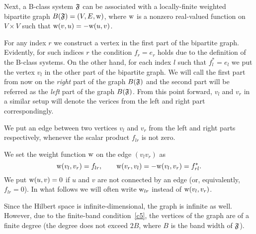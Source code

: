 \documentclass[12pt,oneside,a4paper]{amsart}
\begin{document}
    Next, a B-class system $\mathfrak{F}$ can be associated with a
      locally-finite weighted bipartite graph $B(\mathfrak{F}) = (V, E, \mathrm{w})$, where $\mathrm{w}$ is a
      nonzero real-valued function on $V\times V$ such that $\mathrm{w}(v, u) = -\mathrm{w}(u, v)$.

    For any index $r$ we construct a vertex in the first part of the bipartite graph.
    Evidently, for such indices $r$ the condition $f_r = e_r$ holds due to the definition of the B-class systems.
    On the other hand, for each index $l$ such that $f^*_l = e_l$ we put the vertex $v_l$ in the other part of the bipartite graph.
    We will call the first part from now on the \emph{right} part of the graph $B(\mathfrak{F})$ and the second part
      will be referred as the \emph{left} part of the graph $B(\mathfrak{F})$.
    From this point forward, $v_l$ and $v_r$ in a similar setup will denote the verices from the left and right part correspondingly.

    We put an edge between two vertices $v_l$ and $v_r$ from the left and right parts respectively,
      whenever the scalar product $f_{lr}$ is not zero.

    We set the weight function $\mathrm{w}$ on the edge $(v_l v_r)$ as
    \begin{equation}
      \label{def-wt}
      \mathrm{w}(v_l, v_r) = f_{lr}, \qquad \mathrm{w}(v_r, v_l) = -\mathrm{w}(v_l, v_r) = f_{rl}^*.
    \end{equation}
    We put $\mathrm{w}(u, v) = 0$ if $u$ and $v$ are not connected by an edge (or, equivalently, $f_{lr} = 0$).
    In what follows we will often write $\mathrm{w}_{lr}$ instead of $\mathrm{w}(v_l, v_r)$.

    Since the Hilbert space is infinite-dimensional, the graph is infinite as well.
    However, due to the finite-band condition~\ref{c5}, the vertices of the graph are of a finite degree (the degree does not
      exceed $2B$, where $B$ is the band width of $\mathfrak{F}$).
\end{document}
